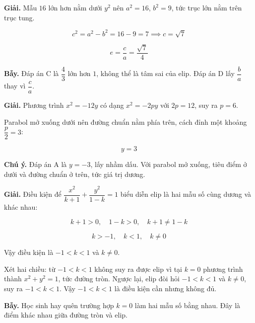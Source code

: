 \documentclass[11pt, a4paper]{article}
\begin{document}
\begin{dapan}[4 — Đáp án A]
\textbf{Giải.} Mẫu $16$ lớn hơn nằm dưới $y^2$ nên $a^2 = 16$, $b^2 = 9$, tức trục lớn nằm trên trục tung.

$$c^2 = a^2 - b^2 = 16 - 9 = 7 \implies c = \sqrt{7}$$

$$e = \frac{c}{a} = \frac{\sqrt{7}}{4}$$

\textbf{Bẫy.} Đáp án C là $\dfrac{4}{3}$ lớn hơn $1$, không thể là tâm sai của elip. Đáp án D lấy $\dfrac{b}{a}$ thay vì $\dfrac{c}{a}$.
\end{dapan}

\begin{dapan}[5 — Đáp án D]
\textbf{Giải.} Phương trình $x^2 = -12y$ có dạng $x^2 = -2py$ với $2p = 12$, suy ra $p = 6$.

Parabol mở xuống dưới nên đường chuẩn nằm phía trên, cách đỉnh một khoảng $\dfrac{p}{2} = 3$:

$$y = 3$$

\textbf{Chú ý.} Đáp án A là $y = -3$, lấy nhầm dấu. Với parabol mở xuống, tiêu điểm ở dưới và đường chuẩn ở trên, tức giá trị dương.
\end{dapan}

\begin{dapan}[6 — Đáp án B]
\textbf{Giải.} Điều kiện để $\dfrac{x^2}{k+1} + \dfrac{y^2}{1-k} = 1$ biểu diễn elip là hai mẫu số cùng dương và khác nhau:

$$k + 1 > 0, \quad 1 - k > 0, \quad k + 1 \ne 1 - k$$

$$k > -1, \quad k < 1, \quad k \ne 0$$

Vậy điều kiện là $-1 < k < 1$ và $k \ne 0$.

Xét hai chiều: từ $-1 < k < 1$ không suy ra được elip vì tại $k = 0$ phương trình thành $x^2 + y^2 = 1$, tức đường tròn. Ngược lại, elip đòi hỏi $-1 < k < 1$ và $k \ne 0$, suy ra $-1 < k < 1$. Vậy $-1 < k < 1$ là điều kiện cần nhưng không đủ.

\textbf{Bẫy.} Học sinh hay quên trường hợp $k = 0$ làm hai mẫu số bằng nhau. Đây là điểm khác nhau giữa đường tròn và elip.
\end{dapan}
\end{document}
